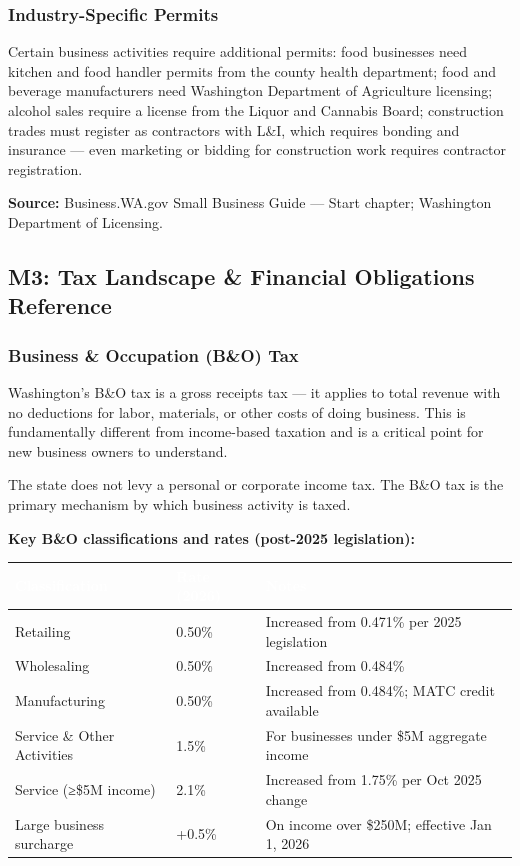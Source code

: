 \documentclass[11pt,letterpaper]{article}
\newcommand{\tableheader}[1]{\textbf{\sffamily\textcolor{white}{#1}}}
\begin{document}
\subsubsection{Industry-Specific Permits}

Certain business activities require additional permits: food businesses need kitchen and food handler permits from the county health department; food and beverage manufacturers need Washington Department of Agriculture licensing; alcohol sales require a license from the Liquor and Cannabis Board; construction trades must register as contractors with L\&I, which requires bonding and insurance --- even marketing or bidding for construction work requires contractor registration.

\textbf{Source:} Business.WA.gov Small Business Guide --- Start chapter; Washington Department of Licensing.

\subsection{M3: Tax Landscape \& Financial Obligations Reference}

\subsubsection{Business \& Occupation (B\&O) Tax}

Washington's B\&O tax is a gross receipts tax --- it applies to total revenue with no deductions for labor, materials, or other costs of doing business. This is fundamentally different from income-based taxation and is a critical point for new business owners to understand.

The state does not levy a personal or corporate income tax. The B\&O tax is the primary mechanism by which business activity is taxed.

\textbf{Key B\&O classifications and rates (post-2025 legislation):}

\begin{center}
\begin{tabularx}{\textwidth}{L{4cm}C{2.5cm}X}
\toprule
{}
\tableheader{Classification} & \tableheader{Rate (2026)} & \tableheader{Notes} \\
\midrule
Retailing & 0.50\% & Increased from 0.471\% per 2025 legislation \\
Wholesaling & 0.50\% & Increased from 0.484\% \\
Manufacturing & 0.50\% & Increased from 0.484\%; MATC credit available \\
Service \& Other Activities & 1.5\% & For businesses under \$5M aggregate income \\
Service (≥\$5M income) & 2.1\% & Increased from 1.75\% per Oct 2025 change \\
Large business surcharge & +0.5\% & On income over \$250M; effective Jan 1, 2026 \\
\bottomrule
\end{tabularx}
\end{center}
\end{document}
